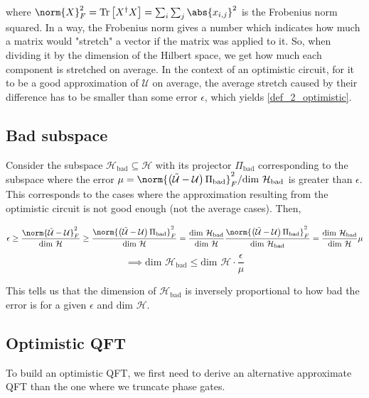 where $\norm{X}^2_F = \text{Tr}\left[X^{\dagger}X\right] = \sum_{i}\sum_{j}\abs{x_{i,j}}^2$ is the Frobenius norm squared. In a way, the Frobenius norm gives a number which indicates how much a matrix would "stretch" a vector if the matrix was applied to it. So, when dividing it by the dimension of the Hilbert space, we get how much each component is stretched on average. In the context of an optimistic circuit, for it to be a good approximation of $\mathcal{U}$ on average, the average stretch caused by their difference has to be smaller than some error $\epsilon$, which yields \ref{def_2_optimistic}.   

\subsection{Bad subspace}
Consider the subspace $\mathcal{H}_{\text{bad}}\subseteq \mathcal{H}$ with its projector $\Pi_{\text{bad}}$ corresponding to the subspace where the error $\mu = \norm{\left(\tilde{\mathcal{U}}-\mathcal{U}\right)\Pi_{\text{bad}}}^2_F/\text{dim }\mathcal{H}_{\text{bad}}$ is greater than $\epsilon$. This corresponds to the cases where the approximation resulting from the optimistic circuit is not good enough (not the average cases). Then,

\begin{equation*}
    \epsilon \geq \frac{\norm{\tilde{\mathcal{U}}-\mathcal{U}}^2_F}{\text{dim }\mathcal{H}} \geq \frac{\norm{\left(\tilde{\mathcal{U}}-\mathcal{U}\right)\Pi_{\text{bad}}}^2_F}{\text{dim }\mathcal{H}} = \frac{\text{dim }\mathcal{H}_{\text{bad}}}{\text{dim }\mathcal{H}} \frac{\norm{\left(\tilde{\mathcal{U}}-\mathcal{U}\right)\Pi_{\text{bad}}}^2_F}{\text{dim }\mathcal{H}_{\text{bad}}} = \frac{\text{dim }\mathcal{H}_{\text{bad}}}{\text{dim }\mathcal{H}} \mu
\end{equation*}
\begin{equation}
    \implies \text{dim }\mathcal{H}_{\text{bad}} \leq \text{dim }\mathcal{H} \cdot \frac{\epsilon}{\mu}
    \label{bad_subspace}
\end{equation}

This tells us that the dimension of $\mathcal{H}_{\text{bad}}$ is inversely proportional to how bad the error is for a given $\epsilon$ and $\text{dim } \mathcal{H}$.

\subsection{Optimistic QFT}
To build an optimistic QFT, we first need to derive an alternative approximate QFT than the one where we truncate phase gates.

